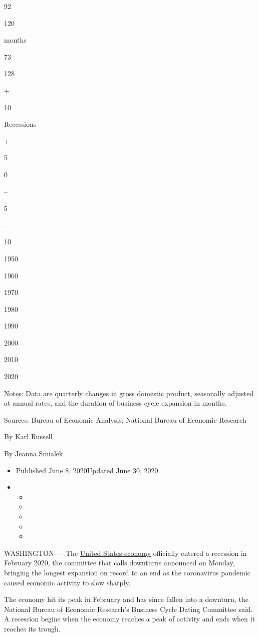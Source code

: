 92

120

months

73

128

+

10

Recessions

+

5

0

--

5

--

10

1950

1960

1970

1980

1990

2000

2010

2020

Notes: Data are quarterly changes in gross domestic product, seasonally
adjusted at annual rates, and the duration of business cycle expansion
in months.

Sources: Bureau of Economic Analysis; National Bureau of Economic
Research

By Karl Russell

By \href{https://www.nytimes.com/by/jeanna-smialek}{Jeanna Smialek}

\begin{itemize}
\item
  Published June 8, 2020Updated June 30, 2020
\item
  \begin{itemize}
  \item
  \item
  \item
  \item
  \item
  \end{itemize}
\end{itemize}

WASHINGTON --- The
\href{https://www.nytimes.com/2020/06/30/us/politics/mnuchin-powell-congress-economic-recovery.html}{United
States economy} officially entered a recession in February 2020, the
committee that calls downturns announced on Monday, bringing the longest
expansion on record to an end as the coronavirus pandemic caused
economic activity to slow sharply.

The economy hit its peak in February and has since fallen into a
downturn, the National Bureau of Economic Research's Business Cycle
Dating Committee said. A recession begins when the economy reaches a
peak of activity and ends when it reaches its trough.

